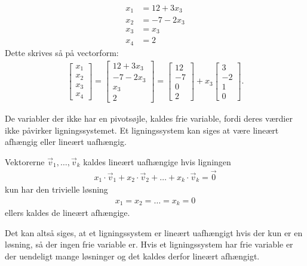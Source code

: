\begin{eks}
\begin{align*}
x_1 &= 12 + 3x_3 \\
x_2 &= -7 - 2x_3 \\
x_3 &= x_3 \\
x_4 &= 2
\end{align*}
Dette skrives så på vectorform:
\begin{align*}
\begin{bmatrix}
x_1 \\
x_2 \\
x_3 \\
x_4 
\end{bmatrix}
= \begin{bmatrix}
12 + 3x_3 \\
-7 - 2x_3 \\
x_3 \\
2
\end{bmatrix}
= \begin{bmatrix}
12 \\
-7 \\
0 \\
2
\end{bmatrix}
+ x_3 \begin{bmatrix}
3 \\
-2 \\
1 \\
0
\end{bmatrix}.
\end{align*}
\end{eks}

De variabler der ikke har en pivotsøjle, kaldes frie variable, fordi deres værdier ikke påvirker ligningssystemet. 
Et ligningssystem kan siges at være lineært afhængig eller lineært uafhængig.

\begin{defn}
Vektorerne $\vec{v}_1, \dots ,\vec{v}_k$ kaldes lineært uafhængige hvis ligningen
\begin{align*}
x_1 \cdot \vec{v}_1+x_2 \cdot \vec{v}_2 + \dots + x_k \cdot \vec{v}_k =  \vec{0}
\end{align*}
kun har den trivielle løsning
\begin{align*}
x_1=x_2= \dots =x_k=0
\end{align*}
ellers kaldes de lineært afhængige.
\label{defn_lin_uafh}
\end{defn}

Det kan altså siges, at et ligningssystem er lineært uafhængigt hvis der kun er en løsning, så der ingen frie variable er. Hvis et ligningssystem har frie variable er der uendeligt mange løsninger og det kaldes derfor lineært afhængigt. 
